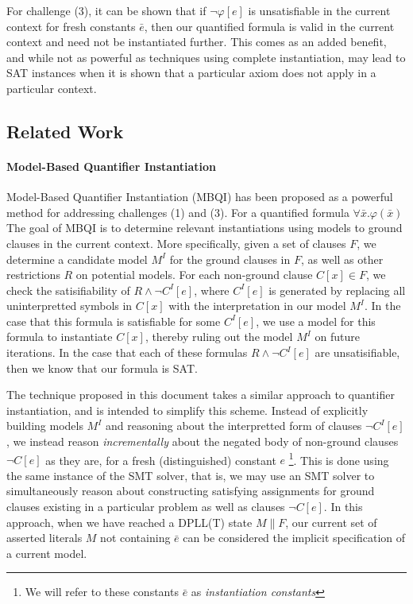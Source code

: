\documentclass{llncs}
\begin{document}
For challenge (3), it can be shown that if $\neg \varphi[e]$ is unsatisfiable in the current context for fresh constants $\bar{e}$, then our quantified formula is valid in the current context and need not be instantiated further.
This comes as an added benefit, and while not as powerful as techniques using complete instantiation, may lead to SAT instances when it is shown that a particular axiom does not apply in a particular context.

\subsection{Related Work}

\paragraph{Model-Based Quantifier Instantiation}
Model-Based Quantifier Instantiation (MBQI) has been proposed as a powerful method for addressing challenges (1) and (3).
For a quantified formula $\forall \bar{x}. \varphi(\bar{x})$
The goal of MBQI is to determine relevant instantiations using models to ground clauses in the current context.
More specifically, given a set of clauses $F$, we determine a candidate model $M^I$ for the ground clauses in $F$, as well as other restrictions $R$ on potential models.
For each non-ground clause $C[x] \in F$, we check the satisifiability of $R \wedge \neg C^I[e]$, where $C^I[e]$ is generated by replacing all uninterpretted symbols in $C[x]$ with the interpretation in our model $M^I$.
In the case that this formula is satisfiable for some $C^I[e]$, we use a model for this formula to instantiate $C[x]$, thereby ruling out the model $M^I$ on future iterations.
In the case that each of these formulas $R \wedge \neg C^I[e]$ are unsatisifiable, then we know that our formula is SAT.


The technique proposed in this document takes a similar approach to quantifier instantiation, and is intended to simplify this scheme.
Instead of explicitly building models $M^I$ and reasoning about the interpretted form of clauses $\neg C^I[e]$, we instead reason \emph{incrementally} about the negated body of non-ground clauses $\neg C[e]$ as they are, for a fresh (distinguished) constant $e$ \footnote{ We will refer to these constants $\bar{e}$ as \emph{instantiation constants} }.
This is done using the same instance of the SMT solver, that is, we may use an SMT solver to simultaneously reason about constructing satisfying assignments for ground clauses existing in a particular problem as well as clauses $\neg C[e]$.
In this approach, when we have reached a DPLL(T) state $M \parallel F$, our current set of asserted literals $M$ not containing $\bar{e}$ can be considered the implicit specification of a current model.
\end{document}
